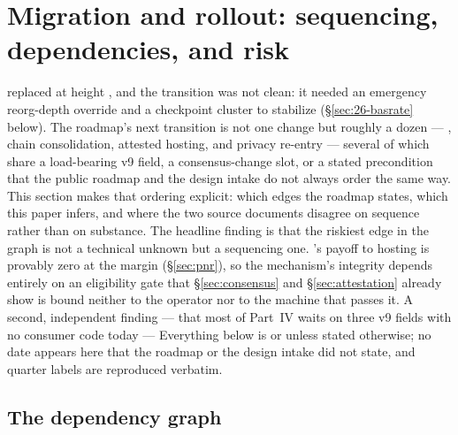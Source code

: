 \section{Migration and rollout: sequencing, dependencies, and risk}\label{sec:26-migration}\label{sec:migration}

\PoN replaced \PoW at height \hpon, and the transition was not clean: it needed an emergency
reorg-depth override and a checkpoint cluster to stabilize (\S\ref{sec:26-basrate} below). The
roadmap's next transition is not one change but roughly a dozen — \PNR, chain consolidation,
attested hosting, and privacy re-entry — several of which share a load-bearing v9 field, a
consensus-change slot, or a stated precondition that the public roadmap and the design intake do
not always order the same way. This section makes that ordering explicit: which edges the roadmap
states, which this paper infers, and where the two source documents disagree on sequence rather
than on substance. The headline finding is that the riskiest edge in the graph is not a technical
unknown but a sequencing one. \PNR's payoff to hosting is provably zero at the margin
(\S\ref{sec:pnr}), so the mechanism's integrity depends entirely on an eligibility gate that
\S\ref{sec:consensus} and \S\ref{sec:attestation} already show is bound neither to the operator nor
to the machine that passes it.  A second,
independent finding — that most of Part~IV waits on three v9 fields with no consumer code today —
Everything below is \planned or \vision unless stated otherwise; no date appears here that the
roadmap or the design intake did not state, and quarter labels are reproduced verbatim.

\subsection{The dependency graph}\label{sec:26-depgraph}

